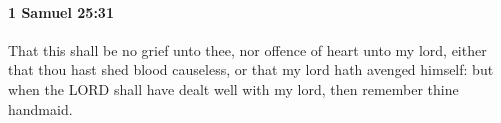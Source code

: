 
		\paragraph{1 Samuel 25:31} %
			\label{1SAMUEL-25-31}

			That this shall be no grief unto thee, nor offence of heart unto my lord, either that thou hast shed blood causeless, or that my lord hath avenged himself: but when the LORD shall have dealt well with my lord, then remember thine handmaid.


